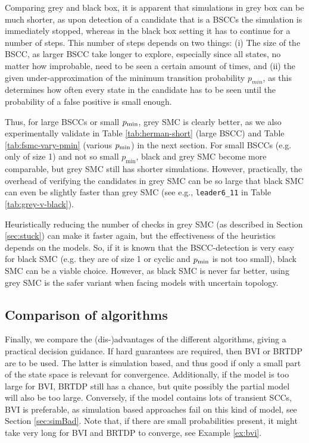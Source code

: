 Comparing grey and black box, it is apparent that simulations in grey box can be much shorter, as upon detection of a candidate that is a BSCCs the simulation is immediately stopped, whereas in the black box setting it has to continue for a number of steps.
This number of steps depends on two things: (i) The size of the BSCC, as larger BSCC take longer to explore, especially since all states, no matter how improbable, need to be seen a certain amount of times, and (ii) the given under-approximation of the minimum transition probability $p_{min}$, as this determines how often every state in the candidate has to be seen until the probability of a false positive is small enough.

Thus, for large BSCCs or small $p_{\min}$, grey SMC is clearly better, as we also experimentally validate in Table \ref{tab:herman-short} (large BSCC) and Table \ref{tab:fsmc-vary-pmin} (various $p_{\min}$) in the next section.
For small BSCCs (e.g. only of size 1) and not so small $p_{\min}$, black and grey SMC become more comparable, but grey SMC still has shorter simulations.
However, practically, the overhead of verifying the candidates in grey SMC can be so large that black SMC can even be slightly faster than grey SMC (see e.g., \texttt{leader6\_11} in Table \ref{tab:grey-v-black}).

Heuristically reducing the number of checks in grey SMC (as described in Section \ref{sec:stuck}) can make it faster again, but the effectiveness of the heuristics depends on the models. 
So, if it is known that the BSCC-detection is very easy for black SMC (e.g. they are of size 1 or cyclic and $p_{\min}$ is not too small), black SMC can be a viable choice. 
However, as black SMC is never far better, using grey SMC is the safer variant when facing models with uncertain topology.

\subsection{Comparison of algorithms}
Finally, we compare the (dis-)advantages of the different algorithms, giving a practical decision guidance.
If hard guarantees are required, then  BVI or BRTDP are to be used.
The latter is simulation based, and thus good if only a small part of the state space is relevant for convergence. 
Additionally, if the model is too large for BVI, BRTDP still has a chance, but quite possibly the partial model will also be too large.
Conversely, if the model contains lots of transient SCCs, BVI is preferable, as simulation based approaches fail on this kind of model, see Section \ref{sec:simBad}.
Note that, if there are small probabilities present, it might take very long for BVI and BRTDP to converge, see Example \ref{ex:bvi}.

